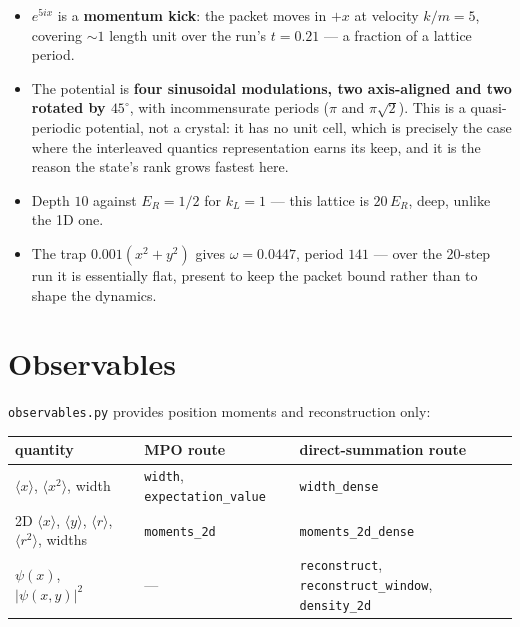 \documentclass[11pt,a4paper]{article}
\newcommand{\code}[1]{\texttt{#1}}
\begin{document}
\begin{itemize}[leftmargin=1.2em]
\item $e^{5ix}$ is a \textbf{momentum kick}: the packet moves in $+x$ at velocity
  $k/m = 5$, covering ${\sim}1$ length unit over the run's $t = 0.21$ --- a fraction
  of a lattice period.
\item The potential is \textbf{four sinusoidal modulations, two axis-aligned and two
  rotated by $45^\circ$}, with incommensurate periods ($\pi$ and $\pi\sqrt{2}$). This
  is a quasi-periodic potential, not a crystal: it has no unit cell, which is
  precisely the case where the interleaved quantics representation earns its keep, and
  it is the reason the state's rank grows fastest here.
\item Depth $10$ against $E_R = 1/2$ for $k_L = 1$ --- this lattice is $20\,E_R$,
  deep, unlike the 1D one.
\item The trap $0.001(x^2+y^2)$ gives $\omega = 0.0447$, period $141$ --- over the
  20-step run it is essentially flat, present to keep the packet bound rather than to
  shape the dynamics.
\end{itemize}

\section{Observables}

\code{observables.py} provides position moments and reconstruction only:

\begin{center}
\begin{tabularx}{\textwidth}{@{}llL@{}}
\toprule
quantity & MPO route & direct-summation route \\
\midrule
$\langle x\rangle$, $\langle x^2\rangle$, width
  & \code{width}, \code{expectation\_value} & \code{width\_dense} \\
\addlinespace
2D $\langle x\rangle$, $\langle y\rangle$, $\langle r\rangle$, $\langle r^2\rangle$, widths
  & \code{moments\_2d} & \code{moments\_2d\_dense} \\
\addlinespace
$\psi(x)$, $|\psi(x,y)|^2$
  & --- & \code{reconstruct}, \code{reconstruct\_window}, \code{density\_2d} \\
\bottomrule
\end{tabularx}
\end{center}
\end{document}
